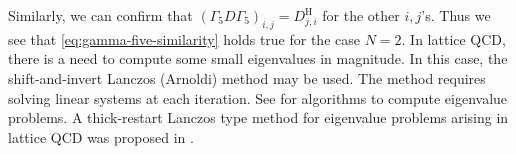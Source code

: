 {Similarly, we can confirm that $(\Gamma_5D\Gamma_5)_{i,j}=D_{j,i}^{\mathrm H}$ for the other $i,j$'s. Thus we see that \eqref{eq:gamma-five-similarity} holds true for the case $N=2$. In lattice QCD, there is a need to compute some small eigenvalues in magnitude. In this case, the shift-and-invert Lanczos (Arnoldi) method may be used. The method requires solving linear systems at each iteration. See  for algorithms to compute eigenvalue problems. A thick-restart Lanczos type method for eigenvalue problems arising in lattice QCD was proposed in .}
